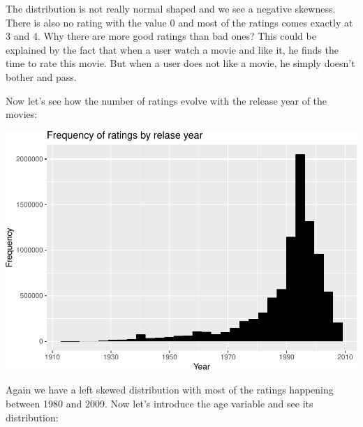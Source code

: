 \documentclass[]{article}
\newenvironment{Shaded}{\begin{snugshade}}{\end{snugshade}}
\newcommand{\KeywordTok}[1]{\textcolor[rgb]{0.13,0.29,0.53}{\textbf{#1}}}
\newcommand{\DataTypeTok}[1]{\textcolor[rgb]{0.13,0.29,0.53}{#1}}
\newcommand{\StringTok}[1]{\textcolor[rgb]{0.31,0.60,0.02}{#1}}
\newcommand{\OperatorTok}[1]{\textcolor[rgb]{0.81,0.36,0.00}{\textbf{#1}}}
\newcommand{\NormalTok}[1]{#1}
\begin{document}
The distribution is not really normal shaped and we see a negative
skewness. There is also no rating with the value 0 and most of the
ratings comes exactly at 3 and 4. Why there are more good ratings than
bad ones? This could be explained by the fact that when a user watch a
movie and like it, he finds the time to rate this movie. But when a user
does not like a movie, he simply doesn't bother and pass.

Now let's see how the number of ratings evolve with the release year of
the movies:

\begin{Shaded}
\end{Shaded}

\includegraphics{Figs/unnamed-chunk-9-1.pdf}

Again we have a left skewed distribution with most of the ratings
happening between 1980 and 2009. Now let's introduce the age variable
and see its distribution:
\end{document}
